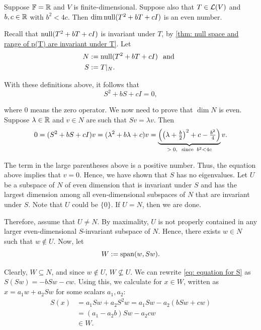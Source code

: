\begin{thm}
  \label{thm: even-dimensional null space}
  Suppose $\mathbb{F} = \mathbb{R}$ and $V$ is finite-dimensional. Suppose also that $T \in \mathcal{L} (V)$ and $b,c \in \mathbb{R}$ with $b^2 < 4c$. Then $\dim \operatorname{null} (T^2 +bT +cI)$ is an even number.
\end{thm}
\begin{prf}
  Recall that $\operatorname{null} (T^2 +bT +cI)$ is invariant under $T$, by \ref{thm: null space and range of p(T) are invariant under T}. Let
  \begin{align}
    N &:= \operatorname{null} (T^2 +bT +cI) \;\;\, \text{and}\;\; \\
    S &:= T|_N.
  \end{align}

  With these definitions above, it follows that
  \begin{equation}
    \label{eq: equation for S}
    S^2 + bS + cI = 0,
  \end{equation}

  where $0$ means the zero operator. We now need to prove that $\dim N$ is even. Suppose $\lambda \in \mathbb{R}$ and $v \in N$ are such that $Sv = \lambda v$. Then
  \begin{equation}
    0 = (S^2 + bS + cI)v = (\lambda ^2 + b \lambda + c)v = \underbrace{\left( \left( \lambda + \tfrac{b}{2}\right)^2 + c - \tfrac{b^2}{4} \right)}_{> \; 0, \;\;\, \text{since}\;\; b^2 < 4c} v.
  \end{equation}

  The term in the large parentheses above is a positive number. Thus, the equation above implies that $v = 0$. Hence, we have shown that $S$ has no eigenvalues.
  Let $U$ be a subspace of $N$ of even dimension that is invariant under $S$ and has the largest dimension among all even-dimensional subspaces of $N$ that are invariant under $S$. Note that $U$ could be $\{0\}$. If $U = N$, then we are done.

  Therefore, assume that $U \neq N$. By maximality, $U$ is not properly contained in any larger even-dimensional $S$-invariant subspace of $N$. Hence, there exists $w \in N$ such that $w \notin U$. Now, let
  \begin{equation}
    W := \operatorname{span} (w, Sw).
  \end{equation}

  Clearly, $W \subseteq N$, and since $w \notin U$, $W \not\subseteq U$. We can rewrite \eqref{eq: equation for S} as $S(Sw) = -bSw - cw$. Using this, we calculate for $x \in W$, written as $x = a_1 w + a_2 Sw$ for some scalars $a_1, a_2$:
  \begin{align}
    S(x) &= a_1 S w + a_2 S^2 w = a_1 S w - a_2 (b Sw + cw) \\
         &= (a_1 - a_2 b) Sw -  a_2 c  w \\
         & \in W.
  \end{align}


\end{prf}
